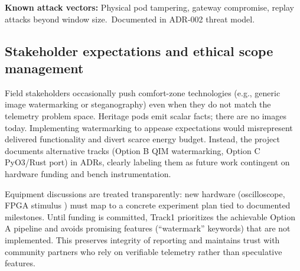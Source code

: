 \textbf{Known attack vectors:} Physical pod tampering, gateway compromise, replay attacks beyond window size.\ Documented in ADR-002 threat model.

\subsection{Stakeholder expectations and ethical scope management}
Field stakeholders occasionally push comfort-zone technologies (e.g., generic image watermarking or steganography) even when they do not match the telemetry problem space. Heritage pods emit scalar facts; there are no images today. Implementing watermarking to appease expectations would misrepresent delivered functionality and divert scarce energy budget. Instead, the project documents alternative tracks (Option B QIM watermarking, Option C PyO3/Rust port) in ADRs, clearly labeling them as future work contingent on hardware funding and bench instrumentation.

Equipment discussions are treated transparently: new hardware (oscilloscope, FPGA stimulus%
) must map to a concrete experiment plan tied to documented milestones. Until funding is committed, Track1 prioritizes the achievable Option A pipeline and avoids promising features (``watermark'' keywords) that are not implemented. This preserves integrity of reporting and maintains trust with community partners who rely on verifiable telemetry rather than speculative features.

